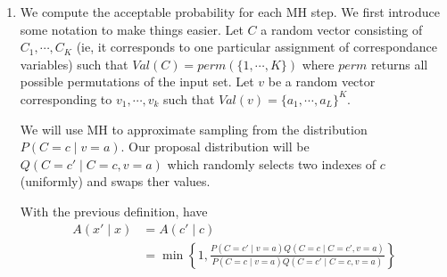 \documentclass[12pt]{article}
\begin{document}
\begin{enumerate}[label=(\alph*)]
  \item We compute the acceptable probability for each MH step. We first introduce some notation to make things easier. Let $C$ a random vector consisting of $C_1, \cdots, C_K$ (ie, it corresponds to one particular assignment of correspondance variables) such that $Val(C) = perm(\{1,\cdots, K\})$ where $perm$ returns all possible permutations of the input set. Let $v$ be a random vector corresponding to $v_1, \cdots, v_k$ such that $Val(v) = \{a_1, \cdots, a_L\}^K$.

  We will use MH to approximate sampling from the distribution $P(C = c\mid v = a)$. Our proposal distribution will be $Q(C = c' \mid C = c, v = a)$ which randomly selects two indexes of $c$ (uniformly) and swaps ther values.

  With the previous definition, have
  \begin{align*}
  	A(x' \mid x) &= A(c' \mid c) \\
  	&= \min \left\{1, \frac{P(C = c' \mid v = a)Q(C = c \mid C = c', v = a)}{P(C = c \mid v = a)Q(C = c' \mid C = c, v = a)} \right\}
  \end{align*}


\end{enumerate}
\end{document}
